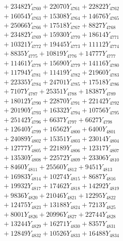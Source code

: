 \documentclass[a4paper,10pt]{article}
\begin{document}
{\begin{align}
&\;  + 23482 Y_{4760} + 22070 Y_{4761} + 22822 Y_{4762} \\[0.3ex]
&\;  + 16054 Y_{4763} + 15308 Y_{4764} + 14676 Y_{4765} \\[0.3ex]
&\;  + 25066 Y_{4766} + 17518 Y_{4767} + 8827 Y_{4768} \\[0.5ex]\allowbreak
&\;  + 23482 Y_{4769} + 15930 Y_{4770} + 18614 Y_{4771} \\[0.3ex]
&\;  + 10321 Y_{4772} + 19445 Y_{4773} + 11112 Y_{4774} \\[0.3ex]
&\;  + 8835 Y_{4775} + 10819 Y_{4776} + 14777 Y_{4777} \\[0.3ex]
&\;  + 11461 Y_{4778} + 15690 Y_{4779} + 14116 Y_{4780} \\[0.3ex]
&\;  + 11794 Y_{4781} + 11419 Y_{4782} + 21960 Y_{4783} \\[0.3ex]
&\;  + 22335 Y_{4784} + 24701 Y_{4785} + 17518 Y_{4786} \\[0.3ex]
&\;  + 7107 Y_{4787} + 25351 Y_{4788} + 18387 Y_{4789} \\[0.3ex]
&\;  + 18012 Y_{4790} + 22870 Y_{4791} + 22142 Y_{4792} \\[0.3ex]
&\;  + 20190 Y_{4793} + 16332 Y_{4794} + 10756 Y_{4795} \\[0.3ex]
&\;  + 25142 Y_{4796} + 6637 Y_{4797} + 6627 Y_{4798} \\[0.5ex]\allowbreak
&\;  + 12640 Y_{4799} + 16562 Y_{4800} + 6400 Y_{4801} \\[0.3ex]
&\;  + 24089 Y_{4802} + 15351 Y_{4803} + 23014 Y_{4804} \\[0.3ex]
&\;  + 12777 Y_{4805} + 22189 Y_{4806} + 12317 Y_{4807} \\[0.3ex]
&\;  + 13530 Y_{4808} + 22572 Y_{4809} + 23306 Y_{4810} \\[0.3ex]
&\;  + 8460 Y_{4811} + 25560 Y_{4812} + 9451 Y_{4813} \\[0.3ex]
&\;  + 16983 Y_{4814} + 10274 Y_{4815} + 8687 Y_{4816} \\[0.3ex]
&\;  + 19932 Y_{4817} + 17462 Y_{4818} + 14292 Y_{4819} \\[0.3ex]
&\;  + 9836 Y_{4820} + 21046 Y_{4821} + 12295 Y_{4822} \\[0.3ex]
&\;  + 12475 Y_{4823} + 13188 Y_{4824} + 7213 Y_{4825} \\[0.3ex]
&\;  + 8001 Y_{4826} + 20996 Y_{4827} + 22744 Y_{4828} \\[0.5ex]\allowbreak
&\;  + 13244 Y_{4829} + 16271 Y_{4830} + 8357 Y_{4831} \\[0.3ex]
&\;  + 12849 Y_{4832} + 10526 Y_{4833} + 16488 Y_{4834} \\[0.3ex]

\end{align}}
\end{document}
